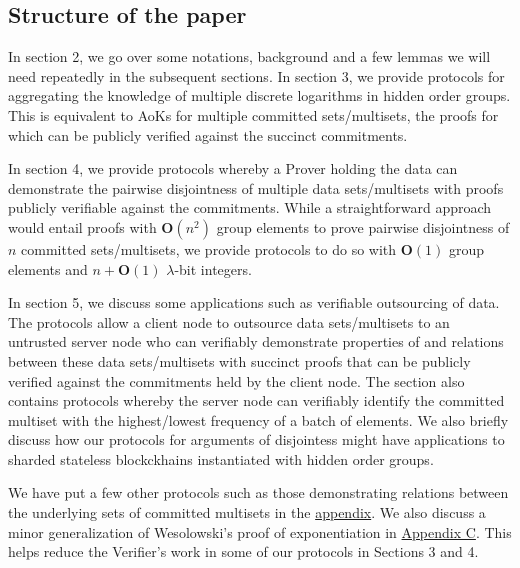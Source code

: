 \documentclass[11pt, lettersize, notitlepage, leqno, footskip=0.6cm]{article}
\newcommand{\mbf}{\mathbf}
\newcommand{\lam}{\lambda}
\newcommand{\bO}{\mbf{O}}
\numberwithin{equation}{section}
\begin{document}
\subsection{\fontsize{11}{11}\selectfont Structure of the paper }

In section 2, we go over some notations, background and a few lemmas we will need repeatedly in the subsequent sections. In section 3, we provide protocols for aggregating the knowledge of multiple discrete logarithms in hidden order groups. This is equivalent to AoKs for multiple committed sets/multisets, the proofs for which can be publicly verified against the succinct commitments. 

In section 4, we provide protocols whereby a Prover holding the data can demonstrate the pairwise disjointness of multiple data sets/multisets with proofs publicly verifiable against the commitments. While a straightforward approach would entail proofs with $\bO(n^2)$ group elements to prove pairwise disjointness of $n$ committed sets/multisets, we provide protocols to do so with $\bO(1)$ group elements and $n+\bO(1)$ $\lam$-bit integers. 

In section 5, we discuss some applications such as verifiable outsourcing of data. The protocols allow a client node to outsource data sets/multisets to an untrusted server node who can verifiably demonstrate properties of and relations between these data sets/multisets with succinct proofs that can be publicly verified against the commitments held by the client node. The section also contains protocols whereby the server node can verifiably identify the committed multiset with the highest/lowest frequency of a batch of elements. We also briefly discuss how our protocols for arguments of disjointess might have applications to sharded stateless blockckhains instantiated with hidden order groups.

We have put a few other protocols such as those demonstrating relations between the underlying sets of committed multisets in the \hyperlink{Sets}{appendix}. We also discuss a minor generalization of Wesolowski's proof of exponentiation in \hyperlink{PoME}{Appendix C}. This helps reduce the Verifier's work in some of our protocols in Sections 3 and 4.
\end{document}
